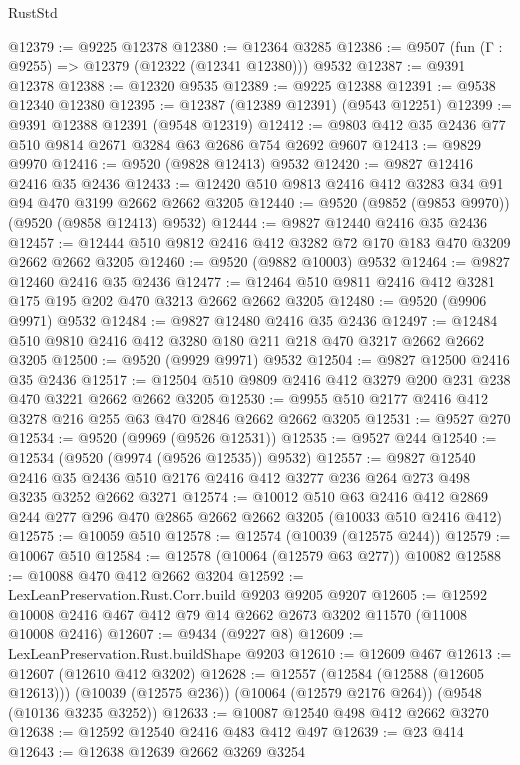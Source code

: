 \begin{lexlean}{RustStd}
\begin{coremodule}
@12379 := @9225 @12378
@12380 := @12364 @3285
@12386 := @9507 (fun (Γ : @9255) => @12379 (@12322 (@12341 @12380))) @9532
@12387 := @9391 @12378
@12388 := @12320 @9535
@12389 := @9225 @12388
@12391 := @9538 @12340 @12380
@12395 := @12387 (@12389 @12391) (@9543 @12251)
@12399 := @9391 @12388 @12391 (@9548 @12319)
@12412 := @9803 @412 @35 @2436 @77 @510 @9814 @2671 @3284 @63 @2686 @754 @2692 @9607
@12413 := @9829 @9970
@12416 := @9520 (@9828 @12413) @9532
@12420 := @9827 @12416 @2416 @35 @2436
@12433 := @12420 @510 @9813 @2416 @412 @3283 @34 @91 @94 @470 @3199 @2662 @2662 @3205
@12440 := @9520 (@9852 (@9853 @9970)) (@9520 (@9858 @12413) @9532)
@12444 := @9827 @12440 @2416 @35 @2436
@12457 := @12444 @510 @9812 @2416 @412 @3282 @72 @170 @183 @470 @3209 @2662 @2662 @3205
@12460 := @9520 (@9882 @10003) @9532
@12464 := @9827 @12460 @2416 @35 @2436
@12477 := @12464 @510 @9811 @2416 @412 @3281 @175 @195 @202 @470 @3213 @2662 @2662 @3205
@12480 := @9520 (@9906 @9971) @9532
@12484 := @9827 @12480 @2416 @35 @2436
@12497 := @12484 @510 @9810 @2416 @412 @3280 @180 @211 @218 @470 @3217 @2662 @2662 @3205
@12500 := @9520 (@9929 @9971) @9532
@12504 := @9827 @12500 @2416 @35 @2436
@12517 := @12504 @510 @9809 @2416 @412 @3279 @200 @231 @238 @470 @3221 @2662 @2662 @3205
@12530 := @9955 @510 @2177 @2416 @412 @3278 @216 @255 @63 @470 @2846 @2662 @2662 @3205
@12531 := @9527 @270
@12534 := @9520 (@9969 (@9526 @12531))
@12535 := @9527 @244
@12540 := @12534 (@9520 (@9974 (@9526 @12535)) @9532)
@12557 := @9827
    @12540
    @2416
    @35
    @2436
    @510
    @2176
    @2416
    @412
    @3277
    @236
    @264
    @273
    @498
    @3235
    @3252
    @2662
    @3271
@12574 := @10012
    @510
    @63
    @2416
    @412
    @2869
    @244
    @277
    @296
    @470
    @2865
    @2662
    @2662
    @3205
    (@10033 @510 @2416 @412)
@12575 := @10059 @510
@12578 := @12574 (@10039 (@12575 @244))
@12579 := @10067 @510
@12584 := @12578 (@10064 (@12579 @63 @277)) @10082
@12588 := @10088 @470 @412 @2662 @3204
@12592 := LexLeanPreservation.Rust.Corr.build @9203 @9205 @9207
@12605 := @12592 @10008 @2416 @467 @412 @79 @14 @2662 @2673 @3202 @11570 (@11008 @10008 @2416)
@12607 := @9434 (@9227 @8)
@12609 := LexLeanPreservation.Rust.buildShape @9203
@12610 := @12609 @467
@12613 := @12607 (@12610 @412 @3202)
@12628 := @12557
    (@12584 (@12588 (@12605 @12613)))
    (@10039 (@12575 @236))
    (@10064 (@12579 @2176 @264))
    (@9548 (@10136 @3235 @3252))
@12633 := @10087 @12540 @498 @412 @2662 @3270
@12638 := @12592 @12540 @2416 @483 @412 @497
@12639 := @23 @414
@12643 := @12638 @12639 @2662 @3269 @3254

\end{coremodule}
\end{lexlean}
